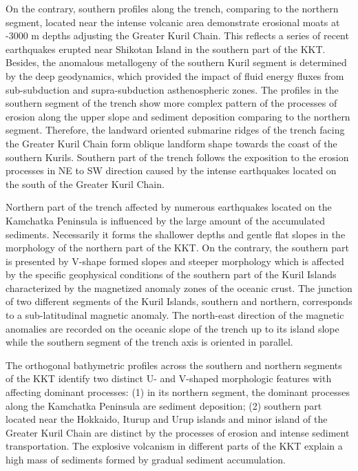 \documentclass[11pt,a4paper]{report}
\begin{document}
{On the contrary, southern profiles along the trench, comparing to the northern segment, located near the intense volcanic area demonstrate erosional moats at -3000 m depths adjusting the Greater Kuril Chain. This reflects a series of recent earthquakes erupted near Shikotan Island in the southern part of the \ac{KKT}. Besides, the anomalous metallogeny of the southern Kuril segment is determined by the deep geodynamics, which provided the impact of fluid energy fluxes from sub-subduction and supra-subduction asthenospheric zones. The profiles in the southern segment of the trench show more complex pattern of the processes of erosion along the upper slope and sediment deposition comparing to the northern segment. Therefore, the landward oriented submarine ridges of the trench facing the Greater Kuril Chain form oblique landform shape towards the coast of the southern Kurils. Southern part of the trench follows the exposition to the erosion processes in NE to SW direction caused by the intense earthquakes located on the south of the Greater Kuril Chain.

Northern part of the trench affected by numerous earthquakes located on the Kamchatka Peninsula is influenced by the large amount of the accumulated sediments. Necessarily it forms the shallower depths and gentle flat slopes in the morphology of the northern part of the \ac{KKT}. On the contrary, the southern part is presented by V-shape formed slopes and steeper morphology which is affected by the specific geophysical conditions of the southern part of the Kuril Islands characterized by the magnetized anomaly zones of the oceanic crust. The junction of two different segments of the Kuril Islands, southern and northern, corresponds to a sub-latitudinal magnetic anomaly. The north-east direction of the magnetic anomalies are recorded on the oceanic slope of the trench up to its island slope while the southern segment of the trench axis is oriented in parallel. 

The orthogonal bathymetric profiles across the southern and northern segments of the \ac{KKT} identify two distinct U- and V-shaped morphologic features with affecting dominant processes: (1) in its northern segment, the dominant processes along the Kamchatka Peninsula are sediment deposition; (2) southern part located near the Hokkaido, Iturup and Urup islands and minor island of the Greater Kuril Chain are distinct by the processes of erosion and intense sediment transportation. The explosive volcanism in different parts of the \ac{KKT} explain a high mass of sediments formed by gradual sediment accumulation.

}
\end{document}
